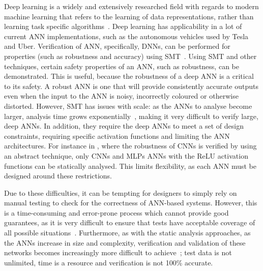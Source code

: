 Deep learning is a widely and extensively researched field with regards to modern machine learning that refers to the learning of data representations, rather than learning task specific algorithms~\cite{schmidhuber2015deep}.
Deep learning has applicability in a lot of current \ac{ANN} implementations, such as the autonomous vehicles used by Tesla and Uber.
Verification of \ac{ANN}, specifically, \acfp{DNN}, can be performed for properties (such as robustness and accuracy) using \ac{SMT}~\cite{Gehr2018AI2SA,reluplex,DeepANNverify}. 
Using \ac{SMT} and other techniques, certain safety properties of an \ac{ANN}, such as robustness, can be demonstrated. 
This is useful, because the robustness of a deep \ac{ANN} is a critical to its safety.
A robust \ac{ANN} is one that will provide consistently accurate outputs even when the input to the \ac{ANN} is noisy, incorrectly coloured or otherwise distorted. 
However, \ac{SMT} has issues with scale: as the \acp{ANN} to analyse become larger, analysis time grows exponentially~\cite{Gehr2018AI2SA}, making it very difficult to verify large, deep \acp{ANN}.
In addition, they require the deep \acp{ANN} to meet a set of design constraints, requiring specific activation functions and limiting the \ac{ANN} architectures.
For instance in \cite{Gehr2018AI2SA}, where the robustness of \acfp{CNN} is verified by using an abstract technique, only \acp{CNN} and \acp{MLP} \acp{ANN} with the \ac{ReLU} activation functions can be statically analysed.
This limits flexibility, as each \ac{ANN} must be designed around these restrictions. %

Due to these difficulties, it can be tempting for designers to simply rely on manual testing to check for the correctness of \ac{ANN}-based systems. 
However, this is a time-consuming and error-prone process which cannot provide good guarantees, as it is very difficult to ensure that tests have acceptable coverage of all possible situations~\cite{ANN-test}.
Furthermore, as with the static analysis approaches, as the \acp{ANN} increase in size and complexity, verification and validation of these networks becomes increasingly more difficult to achieve~\cite{Gehr2018AI2SA}; test data is not unlimited, time is a resource and verification is not 100\% accurate. 

